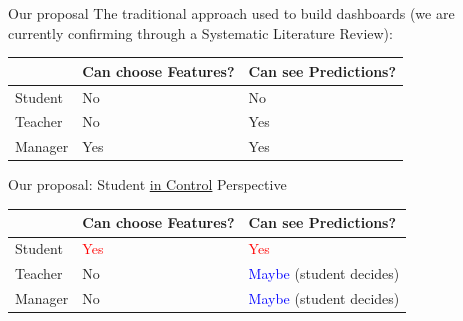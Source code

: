 \begin{frame}{Our proposal}
    The traditional approach used to build dashboards (we are currently confirming through a Systematic Literature Review):

    \begin{table}[]
        \begin{tabular}{|l|l|l|} \hline
                 & Can choose Features? & Can see Predictions?\\ \hline
         Student & No                   & No                  \\ \hline
         Teacher & No                   & Yes                 \\ \hline
         Manager & Yes                  & Yes                 \\ \hline
        \end{tabular}
    \end{table}

    \pause
    Our proposal: Student \underline{in Control} Perspective
    \pause
    \begin{table}[]
        \begin{tabular}{|l|l|l|} \hline
                 & Can choose Features?  & Can see Predictions?                    \\ \hline
         Student & \textcolor{red}{Yes}  & \textcolor{red}{Yes}                    \\ \hline
         Teacher & No                    & \textcolor{blue}{Maybe} (student decides) \\ \hline
         Manager & No                    & \textcolor{blue}{Maybe} (student decides) \\ \hline
        \end{tabular}
    \end{table}

\end{frame}



